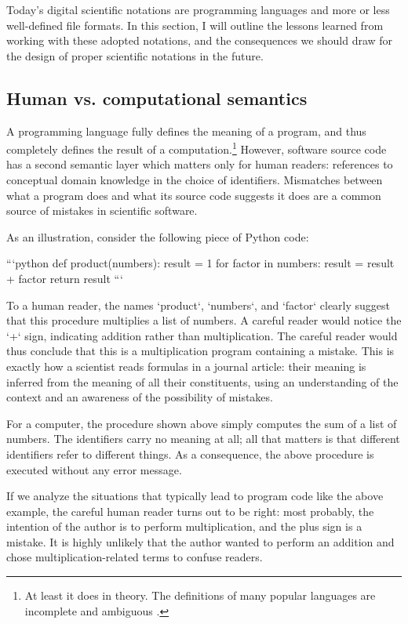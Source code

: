 Today's digital scientific notations are programming languages and more or less well-defined file formats. In this section, I will outline the lessons learned from working with these adopted notations, and the consequences we should draw for the design of proper scientific notations in the future.

\subsection{Human vs. computational semantics}
\label{HCI-semantics}

A programming language fully defines the meaning of a program, and thus completely defines the result of a computation.\footnote{At least it does in theory. The definitions of many popular languages are incomplete and ambiguous \cite{regehr_guide_2010}.} However, software source code has a second semantic layer which matters only for human readers: references to conceptual domain knowledge in the choice of identifiers. Mismatches between what a program does and what its source code suggests it does are a common source of mistakes in scientific software.

As an illustration, consider the following piece of Python code:

```python
def product(numbers):
    result = 1
    for factor in numbers:
        result = result + factor
    return result
```

To a human reader, the names `product`, `numbers`, and `factor` clearly suggest that this procedure multiplies a list of numbers. A careful reader would notice the `+` sign, indicating addition rather than multiplication. The careful reader would thus conclude that this is a multiplication program containing a mistake. This is exactly how a scientist reads formulas in a journal article: their meaning is inferred from the meaning of all their constituents, using an understanding of the context and an awareness of the possibility of mistakes.

For a computer, the procedure shown above simply computes the sum of a list of numbers. The identifiers carry no meaning at all; all that matters is that different identifiers refer to different things. As a consequence, the above procedure is executed without any error message.

If we analyze the situations that typically lead to program code like the above example, the careful human reader turns out to be right: most probably, the intention of the author is to perform multiplication, and the plus sign is a mistake. It is highly unlikely that the author wanted to perform an addition and chose multiplication-related terms to confuse readers.

